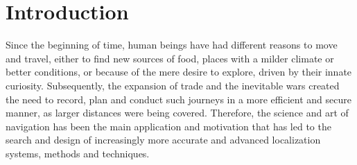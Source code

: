 \section{Introduction}
\label{sec:2_1_intro}
Since the beginning of time, human beings have had different reasons to move and travel, either to find new sources of food, places with a milder climate or better conditions, or because of the mere desire to explore, driven by their innate curiosity.
Subsequently, the expansion of trade and the inevitable wars created the need to record, plan and conduct such journeys in a more efficient and secure manner, as larger distances were being covered. 
Therefore, the science and art of navigation has been the main application and motivation that has led to the search and design of increasingly more accurate and advanced localization systems, methods and techniques.

